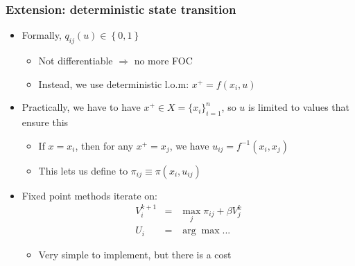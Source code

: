 \documentclass[bigger,handout]{beamer}
\begin{document}
\begin{frame}%

\frametitle{Extension: deterministic state transition}

\begin{itemize}
\item Formally, $q_{ij}\left( u\right) \in \left\{ 0,1\right\} $

\begin{itemize}
\item Not differentiable $\Rightarrow $ no more FOC

\item Instead, we use deterministic l.o.m: $x^{+}=f\left( x_{i},u\right) $
\end{itemize}

\item Practically, we have to have $x^{+}\in X=\{x_{i}\}_{i=1}^{n}$,\newline
so $u$ is limited to values that ensure this

\begin{itemize}
\item If $x=x_{i}$, then for any $x^{+}=x_{j}$, \newline
we have $u_{ij}=f^{-1}\left( x_{i},x_{j}\right) $

\item This lets us define to $\pi _{ij}\equiv \pi \left( x_{i},u_{ij}\right)
$
\end{itemize}

\item Fixed point methods iterate on:%
\begin{eqnarray*}
V_{i}^{k+1} &=&\max_{j}\pi _{ij}+\beta V_{j}^{k} \\
U_{i} &=&\arg \max ...
\end{eqnarray*}

\begin{itemize}
\item Very simple to implement, but there is a cost
\end{itemize}
\end{itemize}



\end{frame}%
\end{document}
